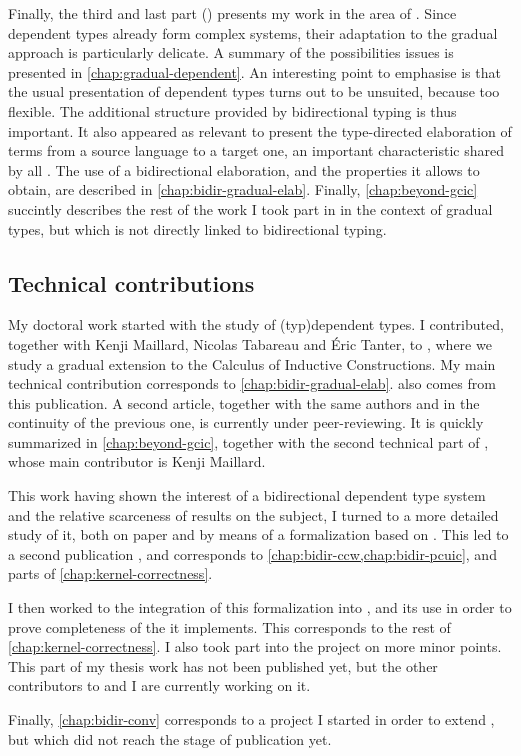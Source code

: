Finally, the third and last part () presents my work in the area
of . Since dependent types already form complex systems, their adaptation
to the gradual approach is particularly delicate. A summary of the possibilities issues is
presented in \cref{chap:gradual-dependent}. An interesting point to emphasise is that the
usual presentation of dependent types turns out to be unsuited, because too flexible.
The additional structure provided by bidirectional typing is thus important. It also
appeared as relevant to present the type-directed elaboration of terms from a source language
to a target one, an important characteristic shared by all .
The use of a bidirectional elaboration, and the properties it allows to obtain, are described
in \cref{chap:bidir-gradual-elab}. Finally, \cref{chap:beyond-gcic} succintly describes the
rest of the work I took part in in the context of gradual types, but which is not directly
linked to bidirectional typing.

\subsection{Technical contributions}

My doctoral work started with the study of  \kl(typ){dependent} types.
I contributed, together with Kenji Maillard, Nicolas Tabareau and Éric Tanter, to
, where we study a gradual extension to the
Calculus of Inductive Constructions. My main technical contribution corresponds
to \cref{chap:bidir-gradual-elab}.  also comes from this
publication. A second article, together with the same authors and in the continuity of the
previous one, is currently under peer-reviewing. It is quickly summarized in
\cref{chap:beyond-gcic}, together with the second technical part of
\textcite{LennonBertrand2022}, whose main contributor is Kenji Maillard.

This work having shown the interest of a bidirectional dependent type system and the relative
scarceness of results on the subject, I turned to a more detailed study of it, both on
paper and by means of a formalization based on . This led to a second publication
, and corresponds to \cref{chap:bidir-ccw,chap:bidir-pcuic},
and parts of \cref{chap:kernel-correctness}.

I then worked to the integration of this formalization into , and its use
in order to prove completeness of the  it implements. This corresponds to the
rest of \cref{chap:kernel-correctness}. I also took part into the project on more minor points.
This part of my thesis work has not been published yet, but the other contributors to
 and I are currently working on it.

Finally, \cref{chap:bidir-conv} corresponds to a project I started in order to extend
, but which did not reach the stage of publication yet.